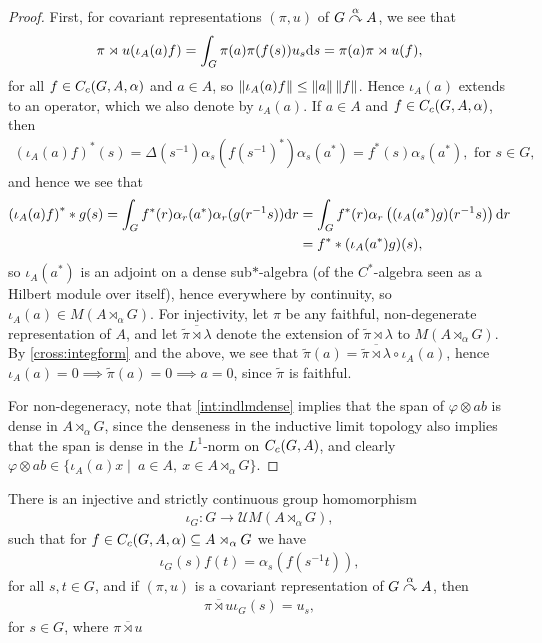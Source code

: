\begin{proof}
First, for covariant representations $(\pi,u)$ of $G \stackrel{\alpha}{\curvearrowright} A$, we see that
\begin{align*}
	\pi \rtimes u(\iota_A(a) f) = \int_G \pi(a) \pi(f(s)) u_s \mathrm{d} s = \pi(a) \pi \rtimes u (f),
\end{align*}
for all $f \in C_c(G,A,\alpha)$ and $a \in A$, so $\left\lVert \iota_A(a) f \right\rVert \leq \left\lVert a \right\rVert \left\lVert f \right\rVert$. Hence $\iota_A(a)$ extends to an operator, which we also denote by $\iota_A(a)$. If $a \in A$ and $f \in C_c(G,A,\alpha)$, then 
\begin{align*}
	\left( \iota_A(a) f \right)^*(s) = \Delta(s^{-1}) \alpha_s(f(s^{-1})^*) \alpha_s(a^*) = f^*(s) \alpha_s(a^*), \text{ for }s \in G,
\end{align*}
and hence we see that 
\begin{align*}
	\left( \iota_A(a) f \right)^* \ast g (s) = \int_G f^*(r) \alpha_r(a^*) \alpha_r(g(r^{-1}s)) \mathrm{d} r &= \int_G f^*(r) \alpha_r \left(  (\iota_A(a^*) g)(r^{-1}s)\right) \mathrm{d} r \\
	&= f^* \ast(\iota_A(a^*) g)(s),
\end{align*}
so $\iota_A(a^*)$ is an adjoint on a dense sub$*$-algebra (of the $C^*$-algebra seen as a Hilbert module over itself), hence everywhere by continuity, so $\iota_A(a) \in M(A \rtimes_\alpha G)$. For injectivity, let $\pi$ be any faithful, non-degenerate representation of $A$, and let $\overline{\tilde \pi \rtimes \lambda}$ denote the extension of $\tilde \pi \rtimes \lambda$ to $M(A \rtimes_\alpha G)$. By \ref{cross:integform} and the above, we see that $\tilde \pi(a) = \overline{\tilde \pi \rtimes \lambda } \circ \iota_A(a)$, hence $\iota_A(a) = 0 \implies \tilde \pi(a) = 0 \implies a = 0$, since $\tilde \pi$ is faithful.

For non-degeneracy, note that \ref{int:indlmdense} implies that the span of $\varphi \otimes ab$ is dense in $A \rtimes_\alpha G$, since the denseness in the inductive limit topology also implies that the span is dense in the $L^1$-norm on $C_c(G,A)$, and clearly $\varphi \otimes ab \in \{ \iota_A(a) x \mid\ a \in A, \ x \in A \rtimes_\alpha G\}$.
\end{proof}
\begin{lemma}
	There is an injective and strictly continuous group homomorphism
	\begin{align*}
		\iota_G \colon G \to \mathcal{U} M(A \rtimes_\alpha G),
	\end{align*}
	such that for $f \in C_c(G,A,\alpha) \subseteq A \rtimes_\alpha G$ we have
	\begin{align*}
		\iota_G(s) f(t) = \alpha_s (f(s^{-1}t)),
	\end{align*}
	for all $s,t \in G$, and if $(\pi,u)$ is a covariant representation of $G \stackrel{\alpha}{\curvearrowright} A$, then
	\begin{align*}
		\overline{\pi \rtimes u} \iota_G(s) =u_s,
	\end{align*}
for $s \in G$, where $\overline {\pi \rtimes u}$
\end{lemma}
